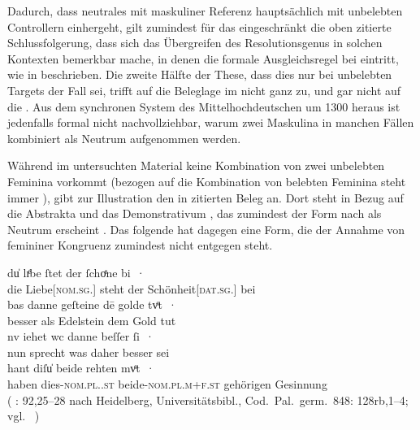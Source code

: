 Dadurch, dass neutrales  mit maskuliner Referenz hauptsächlich mit
unbelebten Controllern einhergeht, gilt zumindest für das \CAO{}
eingeschränkt die oben zitierte Schlussfolgerung, dass sich das Übergreifen des
Resolutionsgenus in solchen Kontexten bemerkbar mache, in
denen die formale Ausgleichsregel bei  eintritt, wie in
 beschrieben. Die zweite Hälfte der These, dass dies nur
bei unbelebten Targets der Fall sei, trifft auf die Beleglage im
\CAO{} nicht ganz zu, und gar nicht auf die \KC{}. Aus dem synchronen System
des Mittelhochdeutschen um 1300 heraus ist jedenfalls
formal nicht nachvollziehbar, warum zwei Maskulina in manchen
Fällen kombiniert als Neutrum aufgenommen werden.

Während im untersuchten Material keine Kombination von zwei
unbelebten Feminina vorkommt (bezogen auf die Kombination von
belebten Feminina steht immer ), gibt
\citet[384]{paul2007} zur Illustration den in 
zitierten Beleg an. Dort steht in Bezug auf die Abstrakta 
 und   das
Demonstrativum  , das
zumindest der Form nach als Neutrum erscheint \autocite[485]{ksw2}. Das
folgende  hat dagegen eine Form, die der Annahme von femininer
Kongruenz zumindest nicht entgegen steht.

\begin{exe}
\ex\label{ex:walther92_25-28_C_2}
	\gll du̍ lıͤbe ſtet der ſchoͤne bi~· \\
			die Liebe[\textsc{nom.sg.\FemI}] steht der
			Schönheit[\textsc{dat.sg.\FemI}] bei \\
\sn \gll bas danne geſteine dē golde tvͦt~· \\
		besser als Edelstein dem Gold tut \\
\sn \gll nv iehet wc danne beſſer ſi~· \\
		nun sprecht was daher besser sei \\
\sn \gll hant diſu̍ beide rehten mvͦt~· \\
		haben dies-\textsc{nom.pl.\NeutI.st} beide-\textsc{nom.pl.m+f\subI.st}
			gehörigen Gesinnung \\
	\trans {}
		(%
			: 92,25--28 nach
			Heidelberg, Universitätsbibl., Cod.~Pal.~germ.~848: 128rb,1--4;
			vgl.~\cite[356--358]{bein2013}%
		)
	\\
\end{exe}

